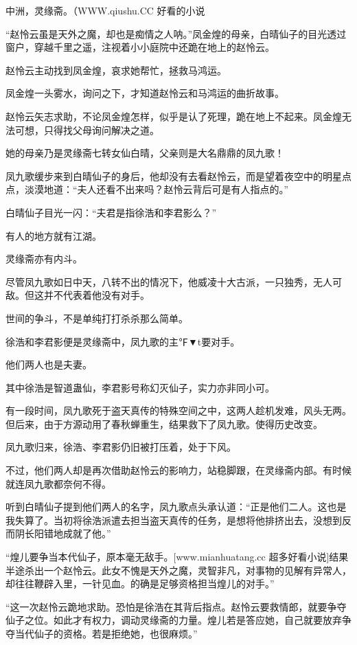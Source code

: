 
\begin{this_body}

中洲，灵缘斋。（WWW.qiushu.CC 好看的小说

“赵怜云虽是天外之魔，却也是痴情之人呐。”凤金煌的母亲，白晴仙子的目光透过窗户，穿越千里之遥，注视着小小庭院中还跪在地上的赵怜云。

赵怜云主动找到凤金煌，哀求她帮忙，拯救马鸿运。

凤金煌一头雾水，询问之下，才知道赵怜云和马鸿运的曲折故事。

赵怜云矢志求助，不论凤金煌怎样，似乎是认了死理，跪在地上不起来。凤金煌无法可想，只得找父母询问解决之道。

她的母亲乃是灵缘斋七转女仙白晴，父亲则是大名鼎鼎的凤九歌！

凤九歌缓步来到白晴仙子的身后，他却没有去看赵怜云，而是望着夜空中的明星点点，淡漠地道：“夫人还看不出来吗？赵怜云背后可是有人指点的。”

白晴仙子目光一闪：“夫君是指徐浩和李君影么？”

有人的地方就有江湖。

灵缘斋亦有内斗。

尽管凤九歌如日中天，八转不出的情况下，他威凌十大古派，一只独秀，无人可敌。但这并不代表着他没有对手。

世间的争斗，不是单纯打打杀杀那么简单。

徐浩和李君影便是灵缘斋中，凤九歌的主℉▼t要对手。

他们两人也是夫妻。

其中徐浩是智道蛊仙，李君影号称幻灭仙子，实力亦非同小可。

有一段时间，凤九歌死于盗天真传的特殊空间之中，这两人趁机发难，风头无两。但后来，由于方源动用了春秋蝉重生，结果救下了凤九歌。使得历史改变。

凤九歌归来，徐浩、李君影仍旧被打压着，处于下风。

不过，他们两人却是再次借助赵怜云的影响力，站稳脚跟，在灵缘斋内部。有时候就连凤九歌都奈何不得。

听到白晴仙子提到他们两人的名字，凤九歌点头承认道：“正是他们二人。这也是我失算了。当初将徐浩派遣去担当盗天真传的任务，是想将他排挤出去，没想到反而阴长阳错地成就了他。”

“煌儿要争当本代仙子，原本毫无敌手。[www.mianhuatang.cc 超多好看小说]结果半途杀出一个赵怜云。此女不愧是天外之魔，灵智非凡，对事物的见解有异常人，却往往鞭辟入里，一针见血。的确是足够资格担当煌儿的对手。”

“这一次赵怜云跪地求助。恐怕是徐浩在其背后指点。赵怜云要救情郎，就要争夺仙子之位。如此才有权力，调动灵缘斋的力量。煌儿若是答应她，自己就要放弃争夺当代仙子的资格。若是拒绝她，也很麻烦。”


\end{this_body}
